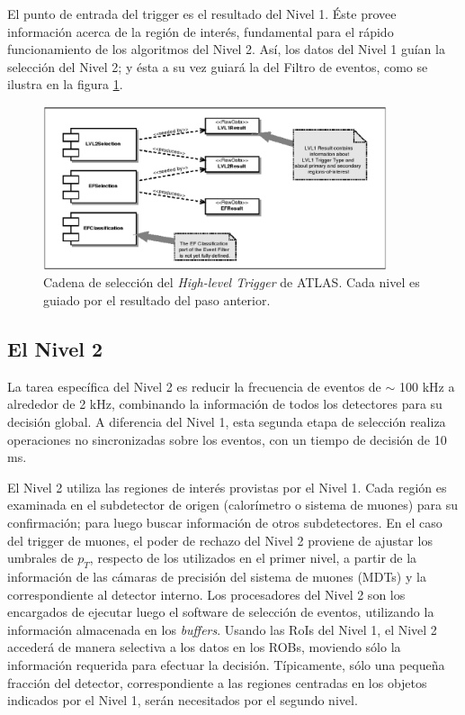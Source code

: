    El punto de entrada del trigger es el resultado del Nivel 1. \'Este provee informaci\'on acerca de la regi\'on de inter\'es, fundamental para el r\'apido funcionamiento de los algoritmos del Nivel 2. As\'i, los datos del Nivel 1 gu\'ian la selecci\'on del Nivel 2; y \'esta a su vez guiar\'a la del Filtro de eventos, como se ilustra en la figura \ref{fig:HLTchainseed}. 
\begin{figure}[!h]
\begin{center}
\includegraphics[width=0.9\textwidth]{Fig3/HLTchain_seeding.eps} 
\caption{Cadena de selecci\'on del \emph{High-level Trigger} de ATLAS. Cada nivel es guiado por el resultado del paso anterior.}
\label{fig:HLTchainseed}
\end{center}
\end{figure}


\subsection{El Nivel 2}
   La tarea espec\'ifica del Nivel 2 es reducir la frecuencia de eventos de $\sim$ 100 kHz a alrededor de 2 kHz, combinando la informaci\'on de todos los detectores para su decisi\'on global. A diferencia del Nivel 1, esta segunda etapa de selecci\'on realiza operaciones no sincronizadas sobre los eventos, con un tiempo de decisi\'on de 10 ms.

   El Nivel 2 utiliza las regiones de inter\'es provistas por el Nivel 1. Cada regi\'on es examinada en el subdetector de origen (calor\'imetro o sistema de muones) para su confirmaci\'on; para luego buscar informaci\'on de otros subdetectores. En el caso del trigger de muones, el poder de rechazo del Nivel 2 proviene de ajustar los umbrales de $p_{T}$, respecto de los utilizados en el primer nivel, a partir de la informaci\'on de las c\'amaras de precisi\'on del sistema de muones (MDTs) y la correspondiente al detector interno.
Los procesadores del Nivel 2 son los encargados de ejecutar luego el software de selecci\'on de eventos, utilizando la informaci\'on almacenada en los \emph{buffers}. Usando las RoIs del Nivel 1, el Nivel 2 acceder\'a de manera selectiva a los datos en los ROBs, moviendo s\'olo la informaci\'on requerida para efectuar la decisi\'on. T\'ipicamente, s\'olo una peque\~na fracci\'on del detector, correspondiente a las regiones centradas en los objetos indicados por el Nivel 1, ser\'an necesitados por el segundo nivel.

